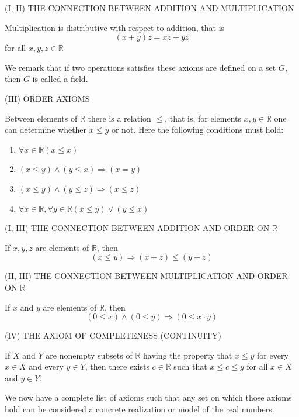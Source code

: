 \documentclass[a4paper,12pt]{article} %
\begin{document}
\begin{center}
    (I, II) THE CONNECTION BETWEEN ADDITION AND MULTIPLICATION
\end{center}
Multiplication is distributive with respect to addition, that
is \[(x+y)z = xz+yz\] for all $x,y,z\in \mathbb{R}$

We remark that if two operations satisfies these axioms 
are defined on a set $G$, then $G$ is called a field.

\begin{center}
    (III) ORDER AXIOMS
\end{center}
Between elements of $\mathbb{R}$ there is a relation $\le$,
that is, for elements $x,y\in\mathbb{R}$ one can determine 
whether $x\le y$ or not. Here the following conditions must 
hold:
\begin{enumerate}
    \item $\forall x\in \mathbb{R}(x\le x)$
    \item $(x\le y)\wedge (y\le x) \Rightarrow (x=y)$
    \item $(x\le y) \wedge(y\le z) \Rightarrow (x\le z)$
    \item $\forall x\in \mathbb{R} ,\forall y\in \mathbb{R} (x\le y) \vee (y\le x)$
\end{enumerate}

\begin{center}
    (I, III) THE CONNECTION BETWEEN ADDITION AND ORDER ON $\mathbb{R}$
\end{center}
If $x,y,z$ are elements of $\mathbb{R}$, then 
\[(x\le y) \Rightarrow (x+z) \le (y+z)\]

\begin{center}
    (II, III) THE CONNECTION BETWEEN MULTIPLICATION AND 
    ORDER ON $\mathbb{R}$
\end{center}
If $x$ and $y$ are elements of $\mathbb{R}$, then
\[(0\le x)\wedge(0\le y) \Rightarrow (0\le x\cdot y)\]

\begin{center}
    (IV) THE AXIOM OF COMPLETENESS (CONTINUITY)
\end{center}
If $X$ and $Y$ are nonempty subsets of $\mathbb{R}$ having 
the property that $x\le y$ for every $x\in X$ and every $y\in Y$,
then there exists $c\in\mathbb{R}$ such that $x\le c \le y$  for 
all $x\in X$ and $y\in Y$.

We now have a complete list of axioms such that any set on 
which those axioms hold can be considered a concrete 
realization or model of the real numbers.
\end{document}
